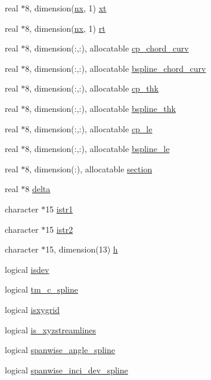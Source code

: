 \begin{DoxyCompactItemize}
\item 
real $\ast$8, dimension(\hyperlink{namespaceglobvar_ae4d2e4d1bd4180999afe29337165e1e6}{nx}, 1) \hyperlink{namespaceglobvar_aee98d6758bfc663151ebb025dc270fa3}{xt}
\item 
real $\ast$8, dimension(\hyperlink{namespaceglobvar_ae4d2e4d1bd4180999afe29337165e1e6}{nx}, 1) \hyperlink{namespaceglobvar_a1f58904a75cc5add66afa721914c4eb7}{rt}
\item 
real $\ast$8, dimension(\+:,\+:), allocatable \hyperlink{namespaceglobvar_a96dfca1007470c8ba8a1d5a54678775f}{cp\+\_\+chord\+\_\+curv}
\item 
real $\ast$8, dimension(\+:,\+:), allocatable \hyperlink{namespaceglobvar_ac2712a968280dc32e12e905f6cc3cc91}{bspline\+\_\+chord\+\_\+curv}
\item 
real $\ast$8, dimension(\+:,\+:), allocatable \hyperlink{namespaceglobvar_a3959c8a967075c593a747c5c54b50a53}{cp\+\_\+thk}
\item 
real $\ast$8, dimension(\+:,\+:), allocatable \hyperlink{namespaceglobvar_af72c9cb4baffb66f0f81b68cef5018e8}{bspline\+\_\+thk}
\item 
real $\ast$8, dimension(\+:,\+:), allocatable \hyperlink{namespaceglobvar_aedf6762d5f8bc876b3c01afd7e8e6b41}{cp\+\_\+le}
\item 
real $\ast$8, dimension(\+:,\+:), allocatable \hyperlink{namespaceglobvar_a5c6f14b2066b824a38b5a56803ec5c3a}{bspline\+\_\+le}
\item 
real $\ast$8, dimension(\+:), allocatable \hyperlink{namespaceglobvar_a7ae731b4717928e79d30248e180567de}{section}
\item 
real $\ast$8 \hyperlink{namespaceglobvar_a9378a0ca5bc1638562a71eb8e31b439d}{delta}
\item 
character $\ast$15 \hyperlink{namespaceglobvar_a8188fa7b4bc004641487eec2f8a46276}{istr1}
\item 
character $\ast$15 \hyperlink{namespaceglobvar_a96979fe04e2455f86ca3dbb38cc4aac1}{istr2}
\item 
character $\ast$15, dimension(13) \hyperlink{namespaceglobvar_a05ffe1b752c11acb73ba6f8a4a854e94}{h}
\item 
logical \hyperlink{namespaceglobvar_a06009d87ddfdfce921d7c631e307aa1e}{isdev}
\item 
logical \hyperlink{namespaceglobvar_a7ef07561b1935adec053ae70c03ec46f}{tm\+\_\+c\+\_\+spline}
\item 
logical \hyperlink{namespaceglobvar_a2432df148a05363a1a9054a0401bc8ac}{isxygrid}
\item 
logical \hyperlink{namespaceglobvar_ac05346905a5106a2caa9e00cbee2e308}{is\+\_\+xyzstreamlines}
\item 
logical \hyperlink{namespaceglobvar_abac88288cb1b27c8e386787aaf593171}{spanwise\+\_\+angle\+\_\+spline}
\item 
logical \hyperlink{namespaceglobvar_a5669ea00f010c1d3530ecb52446dd4fb}{spanwise\+\_\+inci\+\_\+dev\+\_\+spline}
\end{DoxyCompactItemize}


